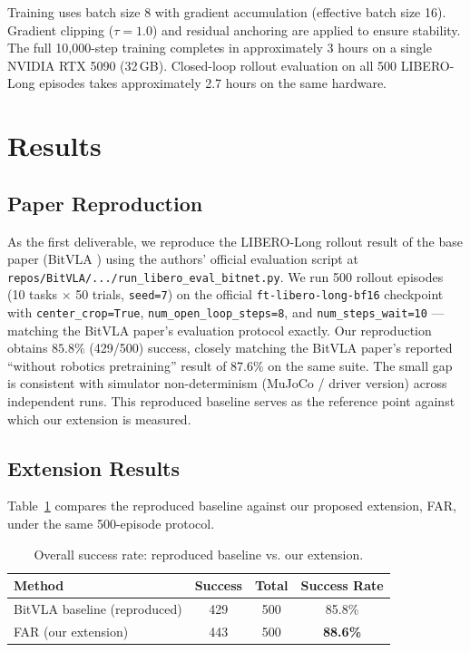 \documentclass[conference]{IEEEtran}
\begin{document}
Training uses batch size 8 with gradient accumulation (effective batch size 16). Gradient clipping ($\tau=1.0$) and residual anchoring are applied to ensure stability. The full 10,000-step training completes in approximately 3 hours on a single NVIDIA RTX 5090 (32\,GB). Closed-loop rollout evaluation on all 500 LIBERO-Long episodes takes approximately 2.7 hours on the same hardware.

\section{Results}

\subsection{Paper Reproduction}

As the first deliverable, we reproduce the LIBERO-Long rollout result of the base paper (BitVLA \cite{wang2025bitvla}) using the authors' official evaluation script at \texttt{repos/BitVLA/.../run\_libero\_eval\_bitnet.py}. We run 500 rollout episodes (10 tasks $\times$ 50 trials, \texttt{seed=7}) on the official \texttt{ft-libero-long-bf16} checkpoint with \texttt{center\_crop=True}, \texttt{num\_open\_loop\_steps=8}, and \texttt{num\_steps\_wait=10} --- matching the BitVLA paper's evaluation protocol exactly. Our reproduction obtains $\mathbf{85.8\%}$ (429/500) success, closely matching the BitVLA paper's reported ``without robotics pretraining'' result of 87.6\% on the same suite. The small gap is consistent with simulator non-determinism (MuJoCo / driver version) across independent runs. This reproduced baseline serves as the reference point against which our extension is measured.

\subsection{Extension Results}

Table~\ref{tab:overall} compares the reproduced baseline against our proposed extension, FAR, under the same 500-episode protocol.

\begin{table}[t]
\centering
\caption{Overall success rate: reproduced baseline vs. our extension.}
\label{tab:overall}
\begin{tabular}{lccc}
\toprule
Method & Success & Total & Success Rate \\
\midrule
BitVLA baseline (reproduced) & 429 & 500 & 85.8\% \\
FAR (our extension)          & 443 & 500 & \textbf{88.6\%} \\
\bottomrule
\end{tabular}
\end{table}
\end{document}
